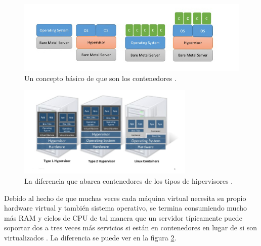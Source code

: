 \begin{figure}
  \begin{center}
      \includegraphics[width=\textwidth]{Figures/que-son-contenedores.jpg}
  \end{center}
  \caption{Un concepto básico de que son los contenedores \citep{Teimouri-Davoud-OS-level-virt}.}
  \label{que-son-contenedores}
\end{figure}

\begin{figure}
  \begin{center}
      \includegraphics[width=0.75\textwidth]{Figures/differencia-hipervisores-contenedores.png}
  \end{center}
  \caption{La diferencia que abarca contenedores de los tipos de hipervisores \citep{Teimouri-Davoud-OS-level-virt}.}
  \label{differencia-hipervisores-contenedores}
\end{figure}

 
Debido al hecho de que muchas veces cada máquina virtual necesita su propio hardware virtual y también sistema operativo, se termina consumiendo mucho más RAM y ciclos de CPU de tal manera que un servidor típicamente puede soportar dos a tres veces más servicios si están en contenedores en lugar de si son virtualizados \citep{Teimouri-Davoud-OS-level-virt}. La diferencia se puede ver en la figura \ref{differencia-hipervisores-contenedores}.
 

